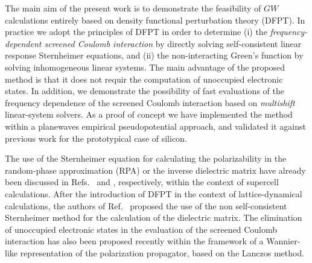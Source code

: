 \documentclass[twocolumn,prb,showpacs,superscriptaddress]{revtex4}
\begin{document}
The main aim of the present work is to demonstrate the feasibility of $GW$ calculations
entirely based on density functional perturbation theory (DFPT).\cite{baroni.rmp}
In practice we adopt the principles of DFPT in order to determine (i)
the {\it frequency-dependent screened Coulomb interaction} 
by directly solving self-consistent linear response Sternheimer equations,
and (ii) the non-interacting Green's function by solving
inhomogeneous linear systems. The main advantage of the proposed method 
is that it does not requir the computation of unoccupied electronic states.
In addition, we demonstrate the possibility of fast evaluations of 
the frequency dependence of the screened Coulomb interaction
based on {\it multishift} linear-system solvers.\cite{frommer}
%
As a proof of concept we have implemented the method within
a planewaves empirical pseudopotential approach,\cite{cohen_berg} 
and validated it against previous work for the prototypical case of silicon.

The use of the Sternheimer equation for calculating the polarizability
in the random-phase approximation (RPA) or the inverse dielectric matrix 
have already been discussed in Refs.\  and ,
respectively, 
within the context of supercell calculations. After the introduction 
of DFPT in the context of lattice-dynamical calculations,\cite{giannozzi} 
the authors of Ref.\  proposed the
use of the non self-consistent Sternheimer method for the calculation
of the dielectric matrix. The elimination of unoccupied electronic states
in the evaluation of the screened Coulomb interaction has also been 
proposed recently within the framework of a Wannier-like representation
of the polarization propagator, based on the Lanczos method.\cite{umari1,umari2}
\end{document}
